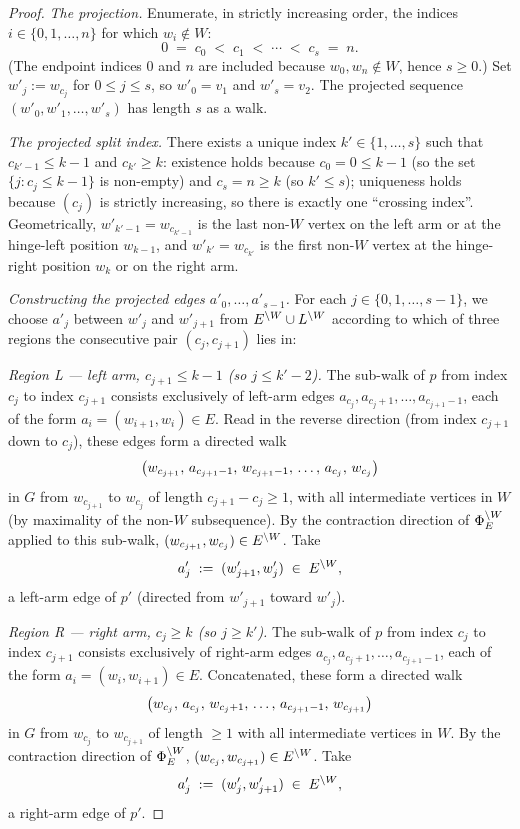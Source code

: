\documentclass[main]{subfiles}
\begin{document}
\begin{proof}
\emph{The projection.} Enumerate, in strictly increasing order, the indices $i \in \{0, 1, \dots, n\}$ for which $w_i \notin W$:
\[
    0 \;=\; c_0 \;<\; c_1 \;<\; \cdots \;<\; c_s \;=\; n.
\]
(The endpoint indices $0$ and $n$ are included because $w_0, w_n \notin W$, hence $s \ge 0$.) Set $w'_j := w_{c_j}$ for $0 \le j \le s$, so $w'_0 = v_1$ and $w'_s = v_2$. The projected sequence $(w'_0, w'_1, \dots, w'_s)$ has length $s$ as a walk.

\emph{The projected split index.} There exists a unique index $k' \in \{1, \dots, s\}$ such that $c_{k'-1} \le k-1$ and $c_{k'} \ge k$: existence holds because $c_0 = 0 \le k-1$ (so the set $\{j : c_j \le k-1\}$ is non-empty) and $c_s = n \ge k$ (so $k' \le s$); uniqueness holds because $(c_j)$ is strictly increasing, so there is exactly one ``crossing index''. Geometrically, $w'_{k'-1} = w_{c_{k'-1}}$ is the last non-$W$ vertex on the left arm or at the hinge-left position $w_{k-1}$, and $w'_{k'} = w_{c_{k'}}$ is the first non-$W$ vertex at the hinge-right position $w_k$ or on the right arm.

\emph{Constructing the projected edges $a'_0, \dots, a'_{s-1}$.}
For each $j \in \{0, 1, \dots, s-1\}$, we choose $a'_j$ between $w'_j$ and $w'_{j+1}$ from $E^{\setminus W} \cup L^{\setminus W}$ according to which of three regions the consecutive pair $(c_j, c_{j+1})$ lies in:

\emph{Region L --- left arm, $c_{j+1} \le k-1$ (so $j \le k' - 2$).}
The sub-walk of $p$ from index $c_j$ to index $c_{j+1}$ consists exclusively of left-arm edges $a_{c_j}, a_{c_j + 1}, \dots, a_{c_{j+1} - 1}$, each of the form $a_i = (w_{i+1}, w_i) \in E$. Read in the reverse direction (from index $c_{j+1}$ down to $c_j$), these edges form a directed walk
\[
    \left ( w_{c_{j+1}},\, a_{c_{j+1} - 1},\, w_{c_{j+1} - 1},\, \dots,\, a_{c_j},\, w_{c_j} \right )
\]
in $G$ from $w_{c_{j+1}}$ to $w_{c_j}$ of length $c_{j+1} - c_j \ge 1$, with all intermediate vertices in $W$ (by maximality of the non-$W$ subsequence). By the contraction direction of $\Phi_E^{\setminus W}$ applied to this sub-walk, $(w_{c_{j+1}}, w_{c_j}) \in E^{\setminus W}$. Take
\[
    a'_j \;:=\; (w'_{j+1}, w'_j) \;\in\; E^{\setminus W},
\]
a left-arm edge of $p'$ (directed from $w'_{j+1}$ toward $w'_j$).

\emph{Region R --- right arm, $c_j \ge k$ (so $j \ge k'$).}
The sub-walk of $p$ from index $c_j$ to index $c_{j+1}$ consists exclusively of right-arm edges $a_{c_j}, a_{c_j + 1}, \dots, a_{c_{j+1} - 1}$, each of the form $a_i = (w_i, w_{i+1}) \in E$. Concatenated, these form a directed walk
\[
    \left ( w_{c_j},\, a_{c_j},\, w_{c_j + 1},\, \dots,\, a_{c_{j+1} - 1},\, w_{c_{j+1}} \right )
\]
in $G$ from $w_{c_j}$ to $w_{c_{j+1}}$ of length $\ge 1$ with all intermediate vertices in $W$. By the contraction direction of $\Phi_E^{\setminus W}$, $(w_{c_j}, w_{c_{j+1}}) \in E^{\setminus W}$. Take
\[
    a'_j \;:=\; (w'_j, w'_{j+1}) \;\in\; E^{\setminus W},
\]
a right-arm edge of $p'$.


\end{proof}
\end{document}
